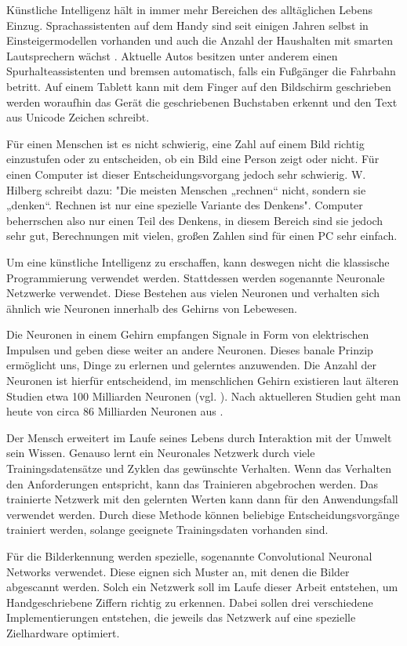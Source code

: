 \documentclass[../main.tex]{subfiles}
\begin{document}
Künstliche Intelligenz hält in immer mehr Bereichen des alltäglichen Lebens Einzug. Sprachassistenten auf dem Handy sind seit einigen Jahren selbst in Einsteigermodellen vorhanden und auch die Anzahl der Haushalten mit smarten Lautsprechern wächst \cite{statisticSprachassistenten}. Aktuelle Autos besitzen unter anderem einen Spurhalteassistenten und bremsen automatisch, falls ein Fußgänger die Fahrbahn betritt. Auf einem Tablett kann mit dem Finger auf den Bildschirm geschrieben werden woraufhin das Gerät die geschriebenen Buchstaben erkennt und den Text aus Unicode Zeichen schreibt. \par

Für einen Menschen ist es nicht schwierig, eine Zahl auf einem Bild richtig einzustufen oder zu entscheiden, ob ein Bild eine Person zeigt oder nicht. Für einen Computer ist dieser Entscheidungsvorgang jedoch sehr schwierig. {W. Hilberg} schreibt dazu: "Die meisten Menschen „rechnen“ nicht, sondern sie „denken“. Rechnen ist nur eine spezielle Variante des Denkens"\cite{articleKuenstlichesGehirn}. Computer beherrschen also nur einen Teil des Denkens, in diesem Bereich sind sie jedoch sehr gut, Berechnungen mit vielen, großen Zahlen sind für einen PC sehr einfach. \par

Um eine künstliche Intelligenz zu erschaffen, kann deswegen nicht die klassische Programmierung verwendet werden. Stattdessen werden sogenannte Neuronale Netzwerke verwendet. Diese Bestehen aus vielen Neuronen und verhalten sich ähnlich wie Neuronen innerhalb des Gehirns von Lebewesen. \par
Die Neuronen in einem Gehirn empfangen Signale in Form von elektrischen Impulsen und geben diese weiter an andere Neuronen. Dieses banale Prinzip ermöglicht uns, Dinge zu erlernen und gelerntes anzuwenden. Die Anzahl der Neuronen ist hierfür entscheidend, im menschlichen Gehirn existieren laut älteren Studien etwa 100 Milliarden Neuronen (vgl. \cite{articleKuenstlichesGehirn}). Nach aktuelleren Studien geht man heute von circa 86 Milliarden Neuronen aus \cite{articleWieVieleNervenzellenHatDasGehirn}. \par

Der Mensch erweitert im Laufe seines Lebens durch Interaktion mit der Umwelt sein Wissen. Genauso lernt ein Neuronales Netzwerk durch viele Trainingsdatensätze und Zyklen das gewünschte Verhalten. Wenn das Verhalten den Anforderungen entspricht, kann das Trainieren abgebrochen werden. Das trainierte Netzwerk mit den gelernten Werten kann dann für den Anwendungsfall verwendet werden. Durch diese Methode können beliebige Entscheidungsvorgänge trainiert werden, solange geeignete Trainingsdaten vorhanden sind. \par

Für die Bilderkennung werden spezielle, sogenannte {Convolutional Neuronal Networks} verwendet. Diese eignen sich Muster an, mit denen die Bilder abgescannt werden. Solch ein Netzwerk soll im Laufe dieser Arbeit entstehen, um Handgeschriebene Ziffern richtig zu erkennen. Dabei sollen drei verschiedene Implementierungen entstehen, die jeweils das Netzwerk auf eine spezielle Zielhardware optimiert. \par
\end{document}
